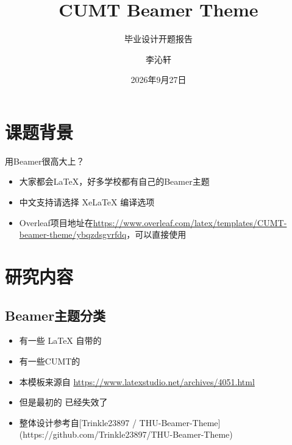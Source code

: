 \documentclass[aspectratio=169]{beamer}
\author{李沁轩}
\title{CUMT Beamer Theme}
\subtitle{毕业设计开题报告}
\institute[计算机科学与技术学院/人工智能学院]{计算机科学与技术学院/人工智能学院\\计算机科学与技术24-3班}
\date{2026年9月27日}
\begin{document}
\kaishu
{
\begin{frame}[plain]
    \titlepage
\end{frame}
}

\begin{frame}
    \tableofcontents[sectionstyle=show,subsectionstyle=show/shaded/hide,subsubsectionstyle=show/shaded/hide]
\end{frame}


\section{课题背景}

\begin{frame}{用Beamer很高大上？}
    \begin{itemize}[<+-| alert@+>] %
        \item 大家都会\LaTeX{}，好多学校都有自己的Beamer主题
        \item 中文支持请选择 Xe\LaTeX{} 编译选项
        \item Overleaf项目地址在\url{https://www.overleaf.com/latex/templates/CUMT-beamer-theme/ybqzdsgvrfdq}，可以直接使用
    \end{itemize}
\end{frame}


\section{研究内容}

\subsection{Beamer主题分类}

\begin{frame}
    \begin{itemize}
        \item 有一些 \LaTeX{} 自带的
        \item 有一些CUMT的
        \item 本模板来源自 \newline \url{https://www.latexstudio.net/archives/4051.html}
        \item 但是最初的 \href{http://far.tooold.cn/post/latex/beamerdlut}{\color{purple}{link}} \cite{origin}已经失效了
        \item 整体设计参考自[Trinkle23897 / THU-Beamer-Theme](https://github.com/Trinkle23897/THU-Beamer-Theme)
    \end{itemize}
\end{frame}
\end{document}
